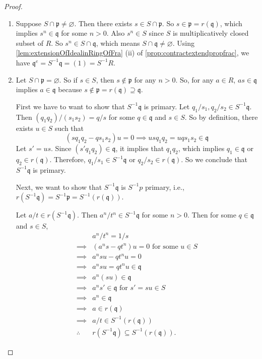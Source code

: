 \begin{proof}
  \begin{enumerate}[label=\roman*)]
    \item Suppose \( S \cap \mathfrak{p} \neq \varnothing \). Then there exists \( s \in S \cap \mathfrak{p} \). So \( s \in \mathfrak{p} = r(\mathfrak{q}) \), which implies \( s^n \in \mathfrak{q} \) for some \( n > 0 \). Also \( s^n \in S \) since \( S \) is multiplicatively closed subset of  \( R \). So  \( s^n \in S \cap \mathfrak{q} \), which means \( S \cap \mathfrak{q} \neq \varnothing \). Using \autoref{lem:extensionOfIdealinRingOfFra} (ii) of \autoref{prop:contractextendpropfrac}, we have \( \mathfrak{q}^e = S^{-1}\mathfrak{q} = (1) = S^{-1}R\).
    \item Let \( S \cap \mathfrak{p} = \varnothing \). So if \( s \in S \), then \( s \not\in \mathfrak{p} \) for any \( n > 0 \). So, for any \( a \in R \), \( as \in \mathfrak{q} \) implies \( a \in \mathfrak{q} \) because \( s \not\in \mathfrak{p} = r(\mathfrak{q}) \supseteq \mathfrak{q} \).

      First we have to want to show that \( S^{-1}\mathfrak{q} \) is primary. Let \( q_1 / s_1, q_2 / s_2 \in S^{-1}\mathfrak{q} \). Then \( (q_1q_2) / (s_1s_2) = q / s\) for some \( q \in \mathfrak{q} \) and \( s \in S \). So by definition, there exists \( u \in S \) such that
       \[
         ( s q_1 q_2 - qs_1s_2 )u = 0 \implies u s q_1 q_2 = uqs_1s_2 \in \mathfrak{q} 
      \] 
      Let \( s' = us \). Since \( (s' q_1 q_2) \in \mathfrak{q}\), it implies that \( q_1 q_2 \), which implies \( q_1 \in \mathfrak{q} \) or \( q_2 \in r(\mathfrak{q}) \). Therefore, \( q_1 / s_1 \in S^{-1}\mathfrak{q} \) or \( q_2 / s_2 \in r(\mathfrak{q}) \). So we conclude that \( S^{-1}\mathfrak{q} \) is primary.

      Next, we want to show that \( S^{-1}\mathfrak{q} \) is \( S^{-1}p \) primary, i.e.,  \( r(S^{-1}\mathfrak{q}) = S^{-1}\mathfrak{p} = S^{-1}(r(\mathfrak{q})) \). 

      Let \( a / t \in r(S^{-1}\mathfrak{q}) \). Then \( a^n / t^n \in S^{-1}\mathfrak{q} \) for some \( n > 0 \). Then for some  \( q \in \mathfrak{q} \) and \( s \in S \), 
       \begin{align*}
           & a^n / t^n = 1 / s\\
         \implies & (a^ns - qt^n)u = 0 \text{ for some } u \in S\\
         \implies & a^n s u - q t^n u = 0\\
         \implies & a^nsu = qt^n u \in \mathfrak{q}\\
         \implies & a^n (su) \in \mathfrak{q}\\
         \implies & a^n s' \in \mathfrak{q} \text{ for } s' = su \in S\\
         \implies & a^n \in \mathfrak{q}\\
         \implies & a \in r(\mathfrak{q})\\
         \implies & a / t \in S^{-1}(r(\mathfrak{q}))\\
         \therefore~&r(S^{-1}\mathfrak{q}) \subseteq S^{-1}(r(\mathfrak{q}))
      .\end{align*}


\end{enumerate}
\end{proof}
